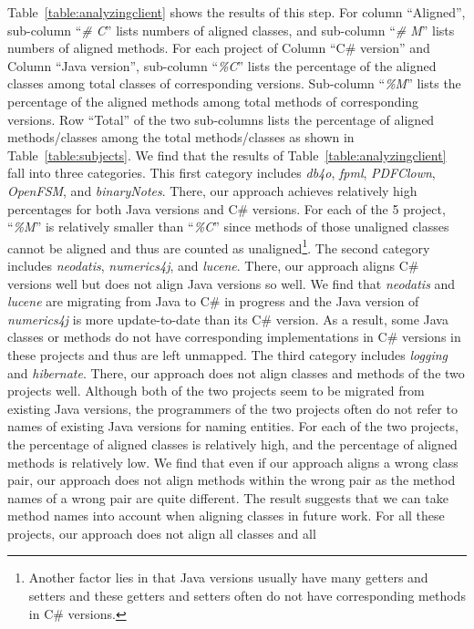 Table~\ref{table:analyzingclient} shows the results of this step.
For column ``Aligned'', sub-column ``\emph{\# C}'' lists numbers of
aligned classes, and sub-column ``\emph{\# M}'' lists numbers of
aligned methods. For each project of Column ``C\# version'' and
Column ``Java version'', sub-column ``\emph{\%C}'' lists the
percentage of the aligned classes among total classes of
corresponding versions. Sub-column ``\emph{\%M}'' lists the
percentage of the aligned methods among total methods of
corresponding versions. Row ``Total'' of the two sub-columns lists
the percentage of aligned methods/classes among the total
methods/classes as shown in Table~\ref{table:subjects}. We find that
the results of Table~\ref{table:analyzingclient} fall into three
categories. This first category includes \emph{db4o}, \emph{fpml},
\emph{PDFClown}, \emph{OpenFSM}, and \emph{binaryNotes}. There, our
approach achieves relatively high percentages for both Java versions
and C\# versions. For each of the 5 project, ``\emph{\%M}'' is
relatively smaller than ``\emph{\%C}'' since methods of those
unaligned classes cannot be aligned and thus are counted as
unaligned\footnote{Another factor lies in that Java versions usually
have many getters and setters and these getters and setters often do
not have corresponding methods in C\# versions.}. The second
category includes \emph{neodatis}, \emph{numerics4j}, and
\emph{lucene}. There, our approach aligns C\# versions well but does
not align Java versions so well. We find that \emph{neodatis} and
\emph{lucene} are migrating from Java to C\# in progress and the
Java version of \emph{numerics4j} is more update-to-date than its
C\# version. As a result, some Java classes or methods do not have
corresponding implementations in C\# versions in these projects and
thus are left unmapped. The third category includes \emph{logging}
and \emph{hibernate}. There, our approach does not align classes and
methods of the two projects well. Although both of the two projects
seem to be migrated from existing Java versions, the programmers of
the two projects often do not refer to names of existing Java
versions for naming entities. For each of the two projects, the
percentage of aligned classes is relatively high, and the percentage
of aligned methods is relatively low. We find that even if our
approach aligns a wrong class pair, our approach does not align
methods within the wrong pair as the method names of a wrong pair
are quite different. The result suggests that we can take method
names into account when aligning classes in future work. For all
these projects, our approach does not align all classes and all
